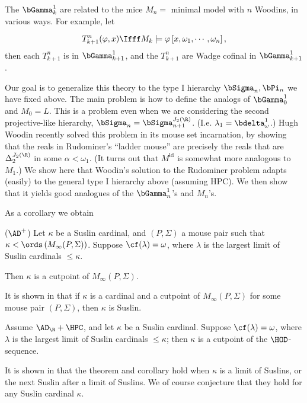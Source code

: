 \documentclass[oneside,12pt]{amsart}
\begin{document}
The $\bGamma^1_{k}$ are related to the mice $M_n = $ minimal model with $n$ Woodins, in various ways. For example, let

$$
T^n_{k+1}(\varphi,x) \Ifff M_k \models \varphi\left[ x,\omega_1,\cdots,\omega_n\right],
$$
then each $T^n_{k+1}$ is in $\bGamma^1_{k+1}$, and the  $T^n_{k+1}$ are Wadge cofinal in
$\bGamma^1_{k+1}$.

Our goal is to generalize this theory to the type I hierarchy $\bSigma_n,\bPi_n$ we have
fixed above. The main problem is how to define the analogs of $\bGamma^1_{0}$ and
$M_0=L$. This is a problem even when we are considering the second projective-like hierarchy,
$\bSigma_n= \bSigma_{n+1}^{J_2(\R)}$. (I.e. $\lambda_1=\bdelta^1_{\omega}$.)
Hugh Woodin recently solved this problem in its mouse set incarnation, by showing that the reals in Rudominer's ``ladder mouse'' are precisely the reals that are $\Delta_2^{J_2(\R)}$ in some
$\alpha<\omega_1$. (It turns out that $M^{\text{ld}}$ is somewhat more analogous to $M_1$.)
We show here that Woodin's solution to the Rudominer problem adapts (easily) to the general type I hierarchy above (assuming HPC). We then show that it yields good analogues of the $\bGamma^1_n$'s
and $M_n$'s.

As a corollary we obtain

\begin{theorem} ($\AD^+$) Let $\kappa$ be a Suslin cardinal, and $(P,\Sigma)$ a
mouse pair such that $\kappa<\ords\left( M_{\infty}(P,\Sigma)  \right)$.
Suppose $\cf(\lambda) = \omega$, where $\lambda$ is the largest limit of Suslin
cardinals $\leq \kappa$.

Then $\kappa$ is a cutpoint of $M_{\infty}(P,\Sigma)$.
\end{theorem}


\begin{remark}
It is shown in \cite{Steel1} that if $\kappa$ is a cardinal and a cutpoint of
$M_{\infty}(P,\Sigma)$ for some mouse pair $(P,\Sigma)$, then $\kappa$ is Suslin.
\end{remark}

\begin{corollary}
Assume $\AD_{\R} + \HPC$, and let $\kappa$ be a Suslin cardinal. Suppose
$\cf(\lambda)=\omega$, where $\lambda$ is the largest limit of Suslin cardinals
$\leq \kappa$; then $\kappa$ is a cutpoint of the $\HOD$-sequence.
\end{corollary}

\begin{remark}
It is shown in \cite{Steel1} that the theorem and corollary hold when $\kappa$
is a limit of Suslins, or the next Suslin after a limit of Suslins.
We of course conjecture that they hold for any Suslin cardinal $\kappa$.
\end{remark}
\end{document}
